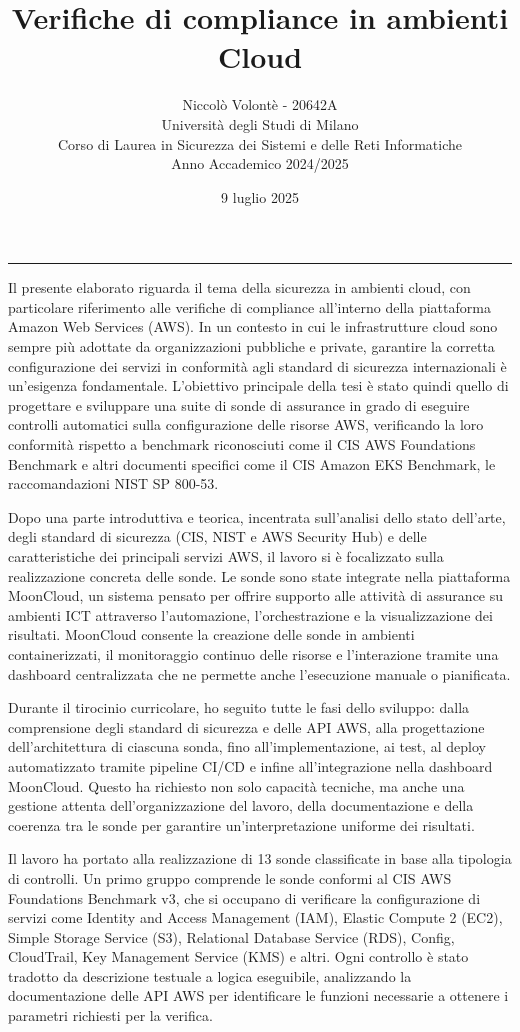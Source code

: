 \documentclass[11pt,a4paper]{article}
\title{\bfseries Verifiche di compliance in ambienti Cloud}
\author{Niccolò Volontè - 20642A\\
\normalsize Università degli Studi di Milano\\
\normalsize Corso di Laurea in Sicurezza dei Sistemi e delle Reti Informatiche\\
\normalsize Anno Accademico 2024/2025}
\date{9 luglio 2025}
\begin{document}
\maketitle
\vspace{1em}
\hrule
\vspace{1em}

Il presente elaborato riguarda il tema della sicurezza in ambienti cloud, con particolare riferimento alle verifiche di compliance all'interno della piattaforma Amazon Web Services (AWS). In un contesto in cui le infrastrutture cloud sono sempre più adottate da organizzazioni pubbliche e private, garantire la corretta configurazione dei servizi in conformità agli standard di sicurezza internazionali è un'esigenza  fondamentale. L'obiettivo principale della tesi è stato quindi quello di progettare e sviluppare una suite di sonde di assurance in grado di eseguire controlli automatici sulla configurazione delle risorse AWS, verificando la loro conformità rispetto a benchmark riconosciuti come il CIS AWS Foundations Benchmark e altri documenti specifici come il CIS Amazon EKS Benchmark, le raccomandazioni NIST SP 800-53.

Dopo una parte introduttiva e teorica, incentrata sull'analisi dello stato dell'arte, degli standard di sicurezza (CIS, NIST e AWS Security Hub) e delle caratteristiche dei principali servizi AWS, il lavoro si è focalizzato sulla realizzazione concreta delle sonde. Le sonde sono state integrate nella piattaforma MoonCloud, un sistema pensato per offrire supporto alle attività di assurance su ambienti ICT attraverso l'automazione, l'orchestrazione e la visualizzazione dei risultati. MoonCloud consente la creazione delle sonde in ambienti containerizzati, il monitoraggio continuo delle risorse e l'interazione tramite una dashboard centralizzata che ne permette anche l'esecuzione manuale o pianificata.

Durante il tirocinio curricolare, ho seguito tutte le fasi dello sviluppo: dalla comprensione degli standard di sicurezza e delle API AWS, alla progettazione dell'architettura di ciascuna sonda, fino all'implementazione, ai test, al deploy automatizzato tramite pipeline CI/CD e infine all'integrazione nella dashboard MoonCloud. Questo ha richiesto non solo capacità tecniche, ma anche una gestione attenta dell'organizzazione del lavoro, della documentazione e della coerenza tra le sonde per garantire un'interpretazione uniforme dei risultati.

Il lavoro ha portato alla realizzazione di 13 sonde classificate in base alla tipologia di controlli. Un primo gruppo comprende le sonde conformi al CIS AWS Foundations Benchmark v3, che si occupano di verificare la configurazione di servizi come Identity and Access Management (IAM), Elastic Compute 2 (EC2), Simple Storage Service (S3), Relational Database Service (RDS), Config, CloudTrail, Key Management Service (KMS) e altri. Ogni controllo è stato tradotto da descrizione testuale a logica eseguibile, analizzando la documentazione delle API AWS per identificare le funzioni necessarie a ottenere i parametri richiesti per la verifica. 
\end{document}
